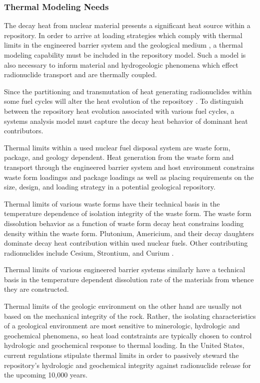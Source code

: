 \subsubsection{Thermal Modeling Needs}
The decay heat from nuclear material presents a significant heat source 
within a repository. In order to arrive at loading strategies which comply with   
thermal limits in the engineered barrier system and the geological medium , a 
thermal modeling capability must be included in the repository model. Such a 
model is also necessary to inform material and hydrogeologic phenomena which 
effect radionuclide transport and are thermally coupled. 

Since the partitioning and transmutation of heat generating radionuclides within  
some fuel cycles will alter the heat evolution of the repository 
\cite{swift_applying_2010}. To distinguish  
between the repository heat evolution associated with various fuel cycles, a 
systems analysis model must capture the decay heat behavior of dominant heat 
contributors. 

Thermal limits within a used nuclear fuel disposal system are waste 
form, package, and geology dependent. Heat generation from the waste form 
and transport through the engineered barrier system and host 
environment constrains waste form loadingss and package loadings as 
well as placing requirements on the size, design, and loading strategy 
in a potential geological repository.

Thermal limits of various waste forms have their technical basis in 
the temperature dependence of isolation integrity of the waste form.  
The waste form dissolution behavior as a function of waste form decay heat 
constrains loading density within the waste form. Plutonium, Americium, and 
their decay daughters dominate decay heat contribution within used nuclear 
fuels. Other contributing radionuclides include Cesium, Strontium, and Curium 
\cite{piet_which_2007}. 
 
Thermal limits of various engineered barrier systems similarly have 
a technical basis in the temperature dependent dissolution rate of the 
materials from whence they are constructed.  

Thermal limits of the geologic environment on the other hand are 
usually not based on the mechanical integrity of the rock.  Rather, 
the isolating characteristics of a geological environment are most 
sensitive to minerologic, hydrologic and geochemical phenomena, so heat load 
contstraints are typically chosen to control hydrologic and 
geochemical response to thermal loading. In the United States, current 
regulations stipulate thermal limits in order to passively steward the 
repository's hydrologic and geochemical integrity against radionuclide  
release for the upcoming 10,000 years.

